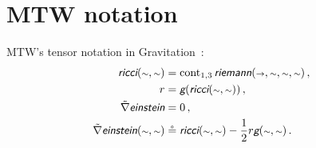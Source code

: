 
\section{MTW notation} %
\label{sec:mtw_notation}
%
MTW's tensor notation in Gravitation~\cite{misner1973}:
%
\begin{align*}
  \mricci\vat{\cslot,\cslot} &= \cont_{1,3}\mriemann\vat{\vslot,\cslot,\cslot,\cslot}\,,\quad \\
  \sricci                    &= \mmetric\vat{\mricci\vat{\cslot,\cslot}}\,,\quad \\
  \gradcov\meinstein         &= 0\,,\\
  \gradcov\meinstein\vat{\cslot,\cslot} &\defas \mricci\vat{\cslot,\cslot}
    - \dfrac 12\sricci\mmetric\vat{\cslot,\cslot}\,.
\end{align*}
%
